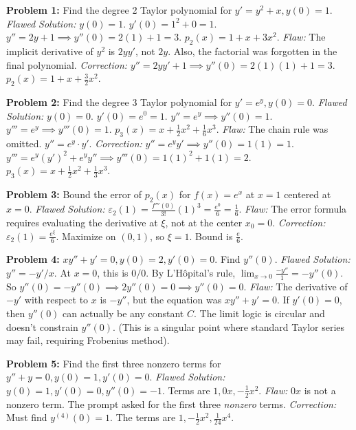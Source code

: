 \documentclass[11pt, letterpaper]{article}
\theoremstyle{definition}
\theoremstyle{remark}
\begin{document}
\textbf{Problem 1:} Find the degree 2 Taylor polynomial for $y' = y^2 + x, y(0)=1$.
\textit{Flawed Solution:} $y(0)=1$. $y'(0) = 1^2 + 0 = 1$. $y'' = 2y + 1 \implies y''(0) = 2(1)+1 = 3$. $p_2(x) = 1 + x + 3x^2$.
\textit{Flaw:} The implicit derivative of $y^2$ is $2yy'$, not $2y$. Also, the factorial was forgotten in the final polynomial.
\textit{Correction:} $y'' = 2yy' + 1 \implies y''(0) = 2(1)(1) + 1 = 3$. $p_2(x) = 1 + x + \frac{3}{2}x^2$.

\textbf{Problem 2:} Find the degree 3 Taylor polynomial for $y' = e^y, y(0)=0$.
\textit{Flawed Solution:} $y(0)=0$. $y'(0) = e^0 = 1$. $y'' = e^y \implies y''(0) = 1$. $y''' = e^y \implies y'''(0) = 1$. $p_3(x) = x + \frac{1}{2}x^2 + \frac{1}{6}x^3$.
\textit{Flaw:} The chain rule was omitted. $y'' = e^y \cdot y'$.
\textit{Correction:} $y'' = e^y y' \implies y''(0) = 1(1) = 1$. $y''' = e^y(y')^2 + e^y y'' \implies y'''(0) = 1(1)^2 + 1(1) = 2$. $p_3(x) = x + \frac{1}{2}x^2 + \frac{1}{3}x^3$.

\textbf{Problem 3:} Bound the error of $p_2(x)$ for $f(x) = e^x$ at $x=1$ centered at $x=0$.
\textit{Flawed Solution:} $\varepsilon_2(1) = \frac{f'''(0)}{3!} (1)^3 = \frac{e^0}{6} = \frac{1}{6}$.
\textit{Flaw:} The error formula requires evaluating the derivative at $\xi$, not at the center $x_0=0$.
\textit{Correction:} $\varepsilon_2(1) = \frac{e^\xi}{6}$. Maximize on $(0, 1)$, so $\xi=1$. Bound is $\frac{e}{6}$.

\textbf{Problem 4:} $xy'' + y' = 0, y(0)=2, y'(0)=0$. Find $y''(0)$.
\textit{Flawed Solution:} $y'' = -y'/x$. At $x=0$, this is $0/0$. By L'Hôpital's rule, $\lim_{x\to 0} \frac{-y''}{1} = -y''(0)$. So $y''(0) = -y''(0) \implies 2y''(0) = 0 \implies y''(0) = 0$.
\textit{Flaw:} The derivative of $-y'$ with respect to $x$ is $-y''$, but the equation was $xy'' + y' = 0$. If $y'(0)=0$, then $y''(0)$ can actually be any constant $C$. The limit logic is circular and doesn't constrain $y''(0)$. (This is a singular point where standard Taylor series may fail, requiring Frobenius method).

\textbf{Problem 5:} Find the first three nonzero terms for $y'' + y = 0, y(0)=1, y'(0)=0$.
\textit{Flawed Solution:} $y(0)=1, y'(0)=0, y''(0)=-1$. Terms are $1, 0x, -\frac{1}{2}x^2$.
\textit{Flaw:} $0x$ is not a nonzero term. The prompt asked for the first three \textit{nonzero} terms.
\textit{Correction:} Must find $y^{(4)}(0) = 1$. The terms are $1, -\frac{1}{2}x^2, \frac{1}{24}x^4$.
\end{document}
